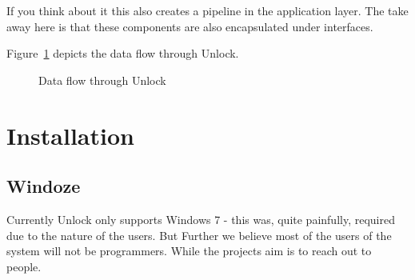 \documentclass[11pt]{article}
\begin{document}
If you think about it this also creates a pipeline in the application layer.  The take away here is that these components are also encapsulated under interfaces.

Figure~\ref{bci-pipeline-fig} depicts the data flow through Unlock.

\begin{figure}[]
\caption{\label{bci-pipeline-fig}  Data flow through Unlock}
\end{figure}



\section{Installation}
\subsection{Windoze}
Currently Unlock only supports Windows 7 - this was, quite painfully, required due to the nature of the users.  But  Further we believe most of the users of the system will not be programmers.  While the projects aim is to reach out to people.
\end{document}
